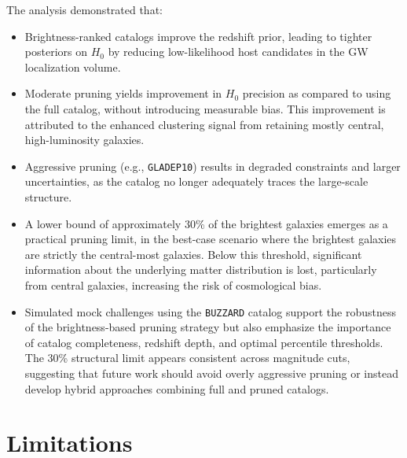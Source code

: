 The analysis demonstrated that:
\vspace{-1em}
\begin{itemize}
    \item Brightness-ranked catalogs improve the redshift prior, leading to tighter posteriors on $H_0$ by reducing low-likelihood host candidates in the \ac{GW} localization volume.
    \vspace{-1em}
    \item Moderate pruning yields improvement in $H_0$ precision as compared to using the full catalog, without introducing measurable bias. This improvement is attributed to the enhanced clustering signal from retaining mostly central, high-luminosity galaxies.
    \vspace{-1em}
    \item Aggressive pruning (e.g., \texttt{GLADEP10}) results in degraded constraints and larger uncertainties, as the catalog no longer adequately traces the large-scale structure.
    \vspace{-1em}
    \item A lower bound of approximately 30\% of the brightest galaxies emerges as a practical pruning limit, in the best-case scenario where the brightest galaxies are strictly the central-most galaxies. Below this threshold, significant information about the underlying matter distribution is lost, particularly from central galaxies, increasing the risk of cosmological bias.
    \vspace{-1em}
    \item Simulated mock challenges using the \texttt{BUZZARD} catalog support the robustness of the brightness-based pruning strategy but also emphasize the importance of catalog completeness, redshift depth, and optimal percentile thresholds. The 30\% structural limit appears consistent across magnitude cuts, suggesting that future work should avoid overly aggressive pruning or instead develop hybrid approaches combining full and pruned catalogs.
\end{itemize}

\section{Limitations}

